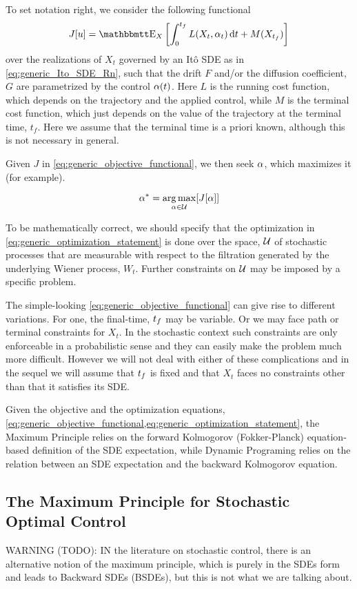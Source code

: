 To set notation right, we consider the following functional
\begin{equation}
J[u] = \Exp_X \left[ \int_0^\tf L(X_t, \a_t) \intd{t} + M(X_\tf) \right]
\label{eq:generic_objective_functional} 
\end{equation}
over the realizations of $X_t$ governed by an It\^o SDE as in
\cref{eq:generic_Ito_SDE_Rn}, such that the drift $F$ and/or the diffusion
coefficient, $G$ are parametrized by the control $\alpha(t)$. Here $L$ is the
running cost function, which depends on the trajectory and the applied control,
while $M$ is the terminal cost function, which just depends on the value of the
trajectory at the terminal time, $t_f$. Here we assume that the terminal time is
a priori known, although this is not necessary in general. 

Given $J$ in \cref{eq:generic_objective_functional}, we then seek $\alpha$, which
maximizes it (for example).

\begin{equation}
\a^* = \argmax_{\a \in \Udomain} [ J[\a] ]
\label{eq:generic_optimization_statement}
\end{equation} 

To be mathematically correct, we should specify that the optimization in
\cref{eq:generic_optimization_statement} is done over the space, ${ \mathcal{U} }$ of
stochastic processes that are measurable with respect to the filtration
generated by the underlying Wiener process, $W_t$. Further constraints on
${ \mathcal{U} }$ may be imposed by a specific problem.

The simple-looking \cref{eq:generic_objective_functional} can give rise to
different variations. For one, the final-time, ${ t_f }$ may be variable. Or we may
face path or terminal constraints for $X_t$. In the stochastic context such
constraints are only enforceable in a probabilistic sense and they can easily
make the problem much more difficult. However we will not deal with either of
these complications and in the sequel we will assume that ${ t_f }$ is fixed and
that $X_t$ faces no constraints other than that it satisfies its SDE.

Given the objective and the optimization equations,
\cref{eq:generic_objective_functional,eq:generic_optimization_statement}, the
Maximum Principle relies on the forward Kolmogorov (Fokker-Planck)
equation-based definition of the SDE expectation, while Dynamic Programing
relies on the relation between an SDE expectation and the backward Kolmogorov
equation.


\subsection{The Maximum Principle for Stochastic Optimal Control} 
\label{sec:maximum_principle_4_stochastic_control}
WARNING (TODO): IN the literature on stochastic control, there is an alternative
notion of the maximum principle, which is purely in the SDEs form and leads to
Backward SDEs (BSDEs), but this is not what we are talking about.

